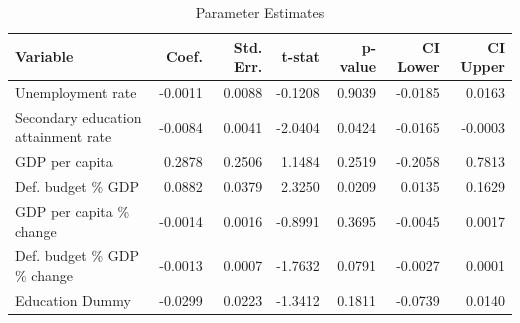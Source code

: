 \begin{table}[htbp]
\caption{Parameter Estimates}
\centering
\begin{threeparttable}
\label{tab:parameter_estimates}
\begin{tabularx}{\textwidth}{@{}Xrrrrrr@{}}
\toprule
\textbf{Variable} & \textbf{Coef.} & \textbf{Std. Err.} & \textbf{t-stat} & \textbf{p-value} & \textbf{CI Lower} & \textbf{CI Upper} \\
\midrule
Unemployment rate & -0.0011 & 0.0088 & -0.1208 & 0.9039 & -0.0185 & 0.0163 \\
Secondary education attainment rate & -0.0084 & 0.0041 & -2.0404 & 0.0424 & -0.0165 & -0.0003 \\
GDP per capita & 0.2878 & 0.2506 & 1.1484 & 0.2519 & -0.2058 & 0.7813 \\
Def. budget \% GDP & 0.0882 & 0.0379 & 2.3250 & 0.0209 & 0.0135 & 0.1629 \\
GDP per capita \% change & -0.0014 & 0.0016 & -0.8991 & 0.3695 & -0.0045 & 0.0017 \\
Def. budget \% GDP \% change & -0.0013 & 0.0007 & -1.7632 & 0.0791 & -0.0027 & 0.0001 \\
Education Dummy & -0.0299 & 0.0223 & -1.3412 & 0.1811 & -0.0739 & 0.0140 \\
\bottomrule
\end{tabularx}
\end{threeparttable}
\label{tab:final_model}
\end{table}